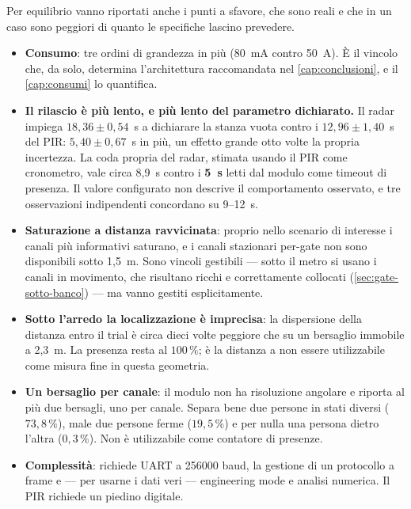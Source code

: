 Per equilibrio vanno riportati anche i punti a sfavore, che sono reali e che in un
caso sono peggiori di quanto le specifiche lascino prevedere.

\begin{itemize}[leftmargin=1.4em,itemsep=3pt]
  \item \textbf{Consumo}: tre ordini di grandezza in più (80~mA contro 50~\textmu A).
        È il vincolo che, da solo, determina l'architettura raccomandata nel
        \cref{cap:conclusioni}, e il \cref{cap:consumi} lo quantifica.
  \item \textbf{Il rilascio è più lento, e più lento del parametro dichiarato.} Il
        radar impiega $18{,}36 \pm 0{,}54$~s a dichiarare la stanza vuota contro i
        $12{,}96 \pm 1{,}40$~s del PIR: $5{,}40 \pm 0{,}67$~s in più, un effetto
        grande otto volte la propria incertezza. La coda propria del radar, stimata
        usando il PIR come cronometro, vale circa 8,9~s contro i \textbf{5~s} letti
        dal modulo come timeout di presenza. Il valore configurato non descrive il
        comportamento osservato, e tre osservazioni indipendenti concordano su 9--12~s.
  \item \textbf{Saturazione a distanza ravvicinata}: proprio nello scenario di
        interesse i canali più informativi saturano, e i canali stazionari per-gate
        non sono disponibili sotto 1,5~m. Sono vincoli gestibili --- sotto il metro si
        usano i canali in movimento, che risultano ricchi e correttamente collocati
        (\cref{sec:gate-sotto-banco}) --- ma vanno gestiti esplicitamente.
  \item \textbf{Sotto l'arredo la localizzazione è imprecisa}: la dispersione della
        distanza entro il trial è circa dieci volte peggiore che su un bersaglio
        immobile a 2,3~m. La presenza resta al $100\,\%$; è la distanza a non essere
        utilizzabile come misura fine in questa geometria.
  \item \textbf{Un bersaglio per canale}: il modulo non ha risoluzione angolare e
        riporta al più due bersagli, uno per canale. Separa bene due persone in stati
        diversi ($73{,}8\,\%$), male due persone ferme ($19{,}5\,\%$) e per nulla una
        persona dietro l'altra ($0{,}3\,\%$). Non è utilizzabile come contatore di
        presenze.
  \item \textbf{Complessità}: richiede UART a 256000 baud, la gestione di un
        protocollo a frame e --- per usarne i dati veri --- engineering mode e analisi
        numerica. Il PIR richiede un piedino digitale.
\end{itemize}

